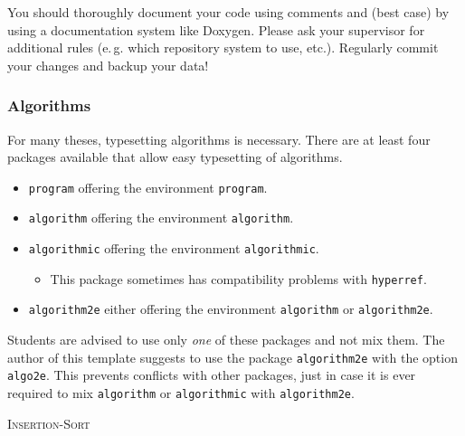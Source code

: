 You should thoroughly document your code using comments and (best case) by using a documentation system like Doxygen. Please ask your supervisor for additional rules (e.\,g. which repository system to use, etc.). Regularly commit your changes and backup your data!

\subsubsection{Algorithms}

For many theses, typesetting algorithms is necessary. There are at least four packages available that allow easy typesetting of algorithms.

\begin{itemize}
\item \texttt{program} offering the environment \texttt{program}.
\item \texttt{algorithm} offering the environment \texttt{algorithm}.
\item \texttt{algorithmic} offering the environment \texttt{algorithmic}.
	\begin{itemize}
	\item This package sometimes has compatibility problems with \texttt{hyperref}.
	\end{itemize}
\item \texttt{algorithm2e} either offering the environment \texttt{algorithm} or \texttt{algorithm2e}.
\end{itemize}

Students are advised to use only \emph{one} of these packages and not mix them. The author of this template suggests to use the package \texttt{algorithm2e} with the option \texttt{algo2e}. This prevents conflicts with other packages, just in case it is ever required to mix \texttt{algorithm} or \texttt{algorithmic} with \texttt{algorithm2e}.

\begin{algorithm2e} 
\caption{\textsc{Insertion-Sort}}

\end{algorithm2e}

